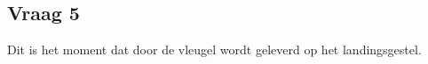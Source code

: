 \documentclass{article}
\begin{document}
\subsection{\textbf{Vraag 5}}
\begin{maplelatex}\begin{Maple Normal}{
Dit is het moment dat door de vleugel wordt geleverd op het landingsgestel.}\end{Maple Normal}
\end{maplelatex}
\begin{maplegroup}
\begin{mapleinput}
\end{mapleinput}
\mapleresult
\begin{maplelatex}
\mapleinline{inert}{2d}{d_L_l_wereld+Vector[column](%
\end{maplelatex}
\end{maplegroup}
\end{document}
